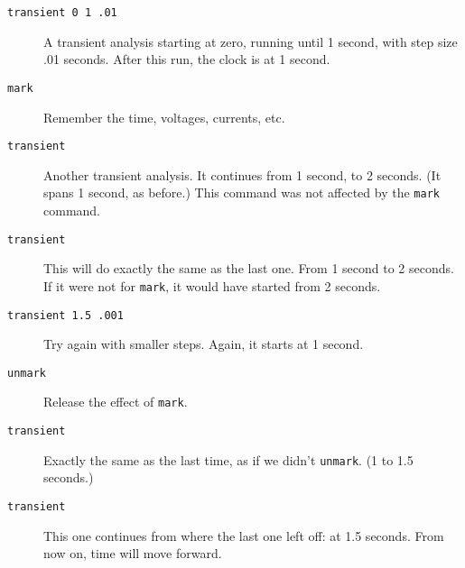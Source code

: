 \begin{description}
\item[{\tt transient 0 1 .01}] A transient analysis starting at zero,
running until 1 second, with step size .01 seconds.  After this run, the
clock is at 1 second.

\item[{\tt mark}] Remember the time, voltages, currents, etc.

\item[{\tt transient}] Another transient analysis.  It continues from 1
second, to 2 seconds.  (It spans 1 second, as before.)  This command was not
affected by the {\tt mark} command.

\item[{\tt transient}] This will do exactly the same as the last one.  From
1 second to 2 seconds.  If it were not for {\tt mark}, it would have started
from 2 seconds.

\item[{\tt transient 1.5 .001}] Try again with smaller steps.  Again, it
starts at 1 second.

\item[{\tt unmark}] Release the effect of {\tt mark}.

\item[{\tt transient}] Exactly the same as the last time, as if we didn't
{\tt unmark}.  (1 to 1.5 seconds.)

\item[{\tt transient}] This one continues from where the last one left off:
at 1.5 seconds.  From now on, time will move forward.

\end{description}

